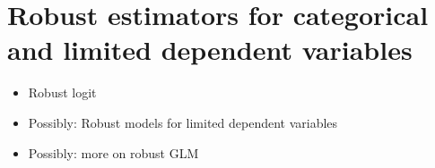 \chapter{Robust estimators for categorical and limited dependent variables}
\label{chap:categorical}

\begin{itemize}
\item
    Robust logit
\item
    Possibly: Robust models for limited dependent variables %
\item
    Possibly: more on robust GLM  %
\end{itemize}


\endinput
